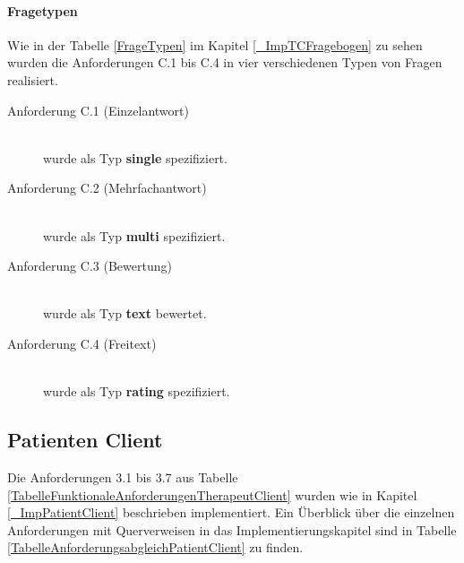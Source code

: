 \paragraph{Fragetypen}
Wie in der Tabelle \ref{FrageTypen} im Kapitel \ref{_ImpTCFragebogen} zu sehen wurden die Anforderungen C.1 bis C.4 in vier verschiedenen Typen von Fragen realisiert.


\begin{description}
	\item[Anforderung C.1 (Einzelantwort)]\hfill \\
	 wurde als Typ \textbf{single} spezifiziert.
	\item[Anforderung C.2 (Mehrfachantwort)] \hfill \\
	 wurde als Typ \textbf{multi} spezifiziert.
	\item[Anforderung C.3 (Bewertung)]\hfill \\
	wurde als Typ \textbf{text} bewertet.
	\item[Anforderung C.4 (Freitext)]\hfill \\
	wurde als Typ \textbf{rating} spezifiziert.
\end{description}
\newpage
\subsection{Patienten Client}
Die Anforderungen 3.1 bis 3.7 aus Tabelle \ref{TabelleFunktionaleAnforderungenTherapeutClient}  wurden wie in Kapitel \ref{_ImpPatientClient} beschrieben implementiert. Ein Überblick über die einzelnen Anforderungen mit Querverweisen in das Implementierungskapitel sind in Tabelle \ref{TabelleAnforderungsabgleichPatientClient} zu finden.

